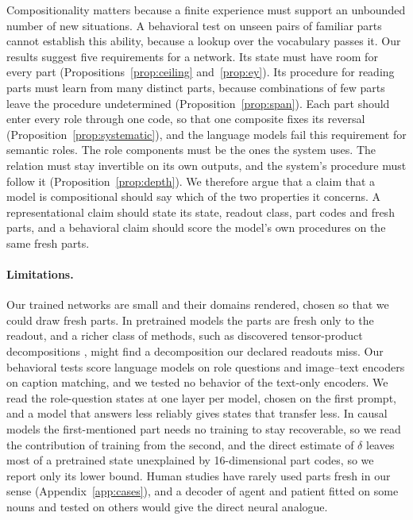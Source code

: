 \documentclass[10pt]{article}
\theoremstyle{plain}
\theoremstyle{remark}
\begin{document}
Compositionality matters because a finite experience must support an unbounded number of new situations. A behavioral test on unseen pairs of familiar parts cannot establish this ability, because a lookup over the vocabulary passes it. Our results suggest five requirements for a network. Its state must have room for every part (Propositions~\ref{prop:ceiling} and~\ref{prop:ey}). Its procedure for reading parts must learn from many distinct parts, because combinations of few parts leave the procedure undetermined (Proposition~\ref{prop:span}). Each part should enter every role through one code, so that one composite fixes its reversal (Proposition~\ref{prop:systematic}), and the language models fail this requirement for semantic roles. The role components must be the ones the system uses. The relation must stay invertible on its own outputs, and the system's procedure must follow it (Proposition~\ref{prop:depth}). We therefore argue that a claim that a model is compositional should say which of the two properties it concerns. A representational claim should state its state, readout class, part codes and fresh parts, and a behavioral claim should score the model's own procedures on the same fresh parts.

\paragraph{Limitations.} Our trained networks are small and their domains rendered, chosen so that we could draw fresh parts. In pretrained models the parts are fresh only to the readout, and a richer class of methods, such as discovered tensor-product decompositions \citep{soulos2020}, might find a decomposition our declared readouts miss. Our behavioral tests score language models on role questions and image--text encoders on caption matching, and we tested no behavior of the text-only encoders. We read the role-question states at one layer per model, chosen on the first prompt, and a model that answers less reliably gives states that transfer less. In causal models the first-mentioned part needs no training to stay recoverable, so we read the contribution of training from the second, and the direct estimate of $\delta$ leaves most of a pretrained state unexplained by 16-dimensional part codes, so we report only its lower bound. Human studies have rarely used parts fresh in our sense (Appendix~\ref{app:cases}), and a decoder of agent and patient \citep{frankland2015} fitted on some nouns and tested on others would give the direct neural analogue.
\end{document}

